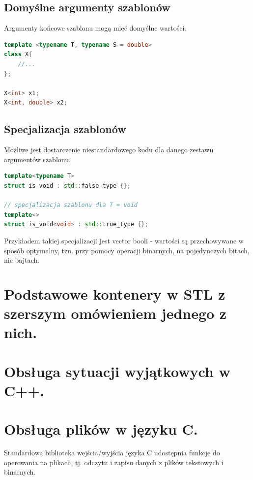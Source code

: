 \documentclass[12pt]{article}
\begin{document}
    \subsection{Domyślne argumenty szablonów}
    
    Argumenty końcowe szablonu mogą mieć domyślne wartości.

    \begin{lstlisting}[language=C++]
template <typename T, typename S = double>
class X{
    //...
};

X<int> x1;
X<int, double> x2;
    \end{lstlisting}

\newpage
    \subsection{Specjalizacja szablonów}
    Możliwe jest dostarczenie niestandardowego kodu dla danego zestawu argumentów szablonu.

    \begin{lstlisting}[language=C++]
template<typename T>   
struct is_void : std::false_type {};

// specjalizacja szablonu dla T = void
template<>
struct is_void<void> : std::true_type {};    
    \end{lstlisting}

    Przykładem takiej specjalizacji jest vector booli - wartości są przechowywane
    w sposób optymalny, tzn. przy pomocy operacji binarnych, na pojedynczych bitach,
    nie bajtach.
    \newpage
    
    \section{Podstawowe kontenery w STL z szerszym omówieniem jednego z nich.}
    \section{Obsługa sytuacji wyjątkowych w C++.}

    \newpage
    
    \section{Obsługa plików w języku C.}
    
    Standardowa biblioteka wejścia/wyjścia języka C udostępnia funkcje do operowania na plikach, tj.
    odczytu i zapisu danych z plików tekstowych i binarnych.\\
    
\end{document}
